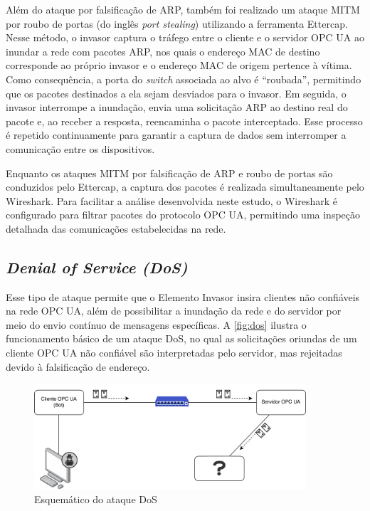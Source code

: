         Além do ataque por falsificação de ARP, também foi realizado um ataque MITM por roubo de portas (do inglês \textit{port stealing}) utilizando a ferramenta Ettercap. Nesse método, o invasor captura o tráfego entre o cliente e o servidor OPC UA ao inundar a rede com pacotes ARP, nos quais o endereço MAC de destino corresponde ao próprio invasor e o endereço MAC de origem pertence à vítima. Como consequência, a porta do \textit{switch} associada ao alvo é ``roubada'', permitindo que os pacotes destinados a ela sejam desviados para o invasor. Em seguida, o invasor interrompe a inundação, envia uma solicitação ARP ao destino real do pacote e, ao receber a resposta, reencaminha o pacote interceptado. Esse processo é repetido continuamente para garantir a captura de dados sem interromper a comunicação entre os dispositivos.

        Enquanto os ataques MITM por falsificação de ARP e roubo de portas são conduzidos pelo Ettercap, a captura dos pacotes é realizada simultaneamente pelo Wireshark. Para facilitar a análise desenvolvida neste estudo, o Wireshark é configurado para filtrar pacotes do protocolo OPC UA, permitindo uma inspeção detalhada das comunicações estabelecidas na rede.

    \subsection{\textit{Denial of Service (DoS)}}

        Esse tipo de ataque permite que o Elemento Invasor insira clientes não confiáveis na rede OPC UA, além de possibilitar a inundação da rede e do servidor por meio do envio contínuo de mensagens específicas. A \autoref{fig:dos} ilustra o funcionamento básico de um ataque DoS, no qual as solicitações oriundas de um cliente OPC UA não confiável são interpretadas pelo servidor, mas rejeitadas devido à falsificação de endereço.

        \begin{figure}[htbp]
            \caption{\label{fig:dos}Esquemático do ataque DoS}
            \begin{center}
                \includegraphics[width=0.9\textwidth]{USPSC-img/dos.png}
            \end{center}
        \end{figure}
        
